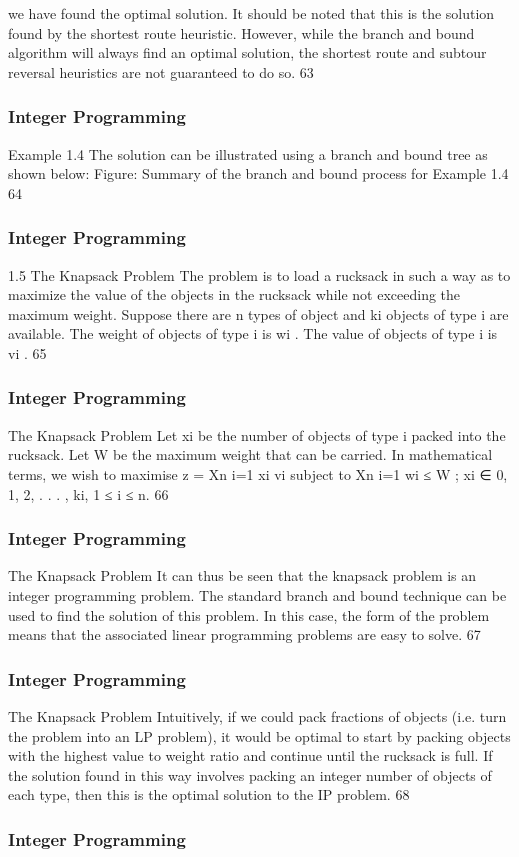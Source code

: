 \begin{frame}
we have found the optimal solution.
It should be noted that this is the solution found by the shortest
route heuristic. However, while the branch and bound algorithm
will always find an optimal solution, the shortest route and subtour
reversal heuristics are not guaranteed to do so.
63 \end{frame}  \begin{frame} \frametitle{Integer Programming}     
Example 1.4
The solution can be illustrated using a branch and bound tree as
shown below:
Figure: Summary of the branch and bound process for Example 1.4
64 \end{frame}  \begin{frame} \frametitle{Integer Programming}     
1.5 The Knapsack Problem
The problem is to load a rucksack in such a way as to maximize
the value of the objects in the rucksack while not exceeding the
maximum weight.
Suppose there are n types of object and ki objects of type i are
available.
The weight of objects of type i is wi
.
The value of objects of type i is vi
.
65 \end{frame}  \begin{frame} \frametitle{Integer Programming}     
The Knapsack Problem
Let xi be the number of objects of type i packed into the rucksack.
Let W be the maximum weight that can be carried.
In mathematical terms, we wish to maximise
z =
Xn
i=1
xi vi
subject to
Xn
i=1
wi ≤ W ; xi ∈ {0, 1, 2, . . . , ki}, 1 ≤ i ≤ n.
66 \end{frame}  \begin{frame} \frametitle{Integer Programming}     
The Knapsack Problem
It can thus be seen that the knapsack problem is an integer
programming problem.
The standard branch and bound technique can be used to find the
solution of this problem.
In this case, the form of the problem means that the associated
linear programming problems are easy to solve.
67 \end{frame}  \begin{frame} \frametitle{Integer Programming}     
The Knapsack Problem
Intuitively, if we could pack fractions of objects (i.e. turn the
problem into an LP problem), it would be optimal to start by
packing objects with the highest value to weight ratio and continue
until the rucksack is full.
If the solution found in this way involves packing an integer
number of objects of each type, then this is the optimal solution to
the IP problem.
68 \end{frame}  \begin{frame} \frametitle{Integer Programming}     

\end{frame}
